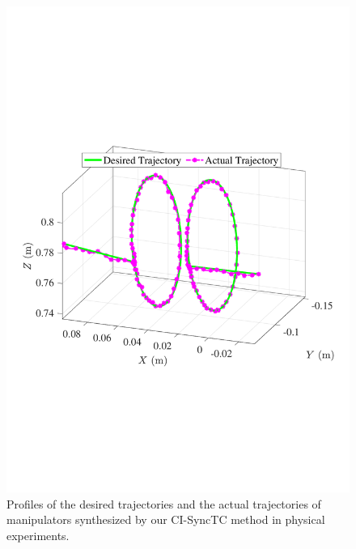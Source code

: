 \documentclass[journal,twoside,web]{ieeecolor}
\begin{document}
\begin{figure}[!t]
    \centering
    \includegraphics[width=0.7\linewidth]{figures/experiment/FIG9_TII-24-5492.pdf}
    \caption{Profiles of the desired trajectories and the actual trajectories of manipulators synthesized by our CI-SyncTC method in physical experiments.
    }
    \label{figures:experiment:path comparison}
\end{figure}
\end{document}

